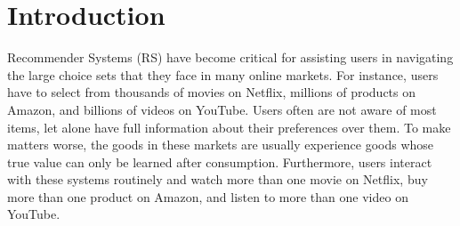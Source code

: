 \documentclass[sigconf]{acmart}
\begin{document}
%
%
\author{Guy Aridor}

\author{Duarte Gon\c{c}alves}
  
  \author{Shan Sikdar}
%

%

\maketitle

\section{Introduction}

Recommender Systems (RS) have become critical for assisting users in navigating the large choice sets that they face in many online markets. For instance, users have to select from thousands of movies on Netflix, millions of products on Amazon, and billions of videos on YouTube. Users often are not aware of most items, let alone have full information about their preferences over them. To make matters worse, the goods in these markets are usually experience goods whose true value can only be learned after consumption. Furthermore, users interact with these systems routinely and watch more than one movie on Netflix, buy more than one product on Amazon, and listen to more than one video on YouTube.
\par
\end{document}
